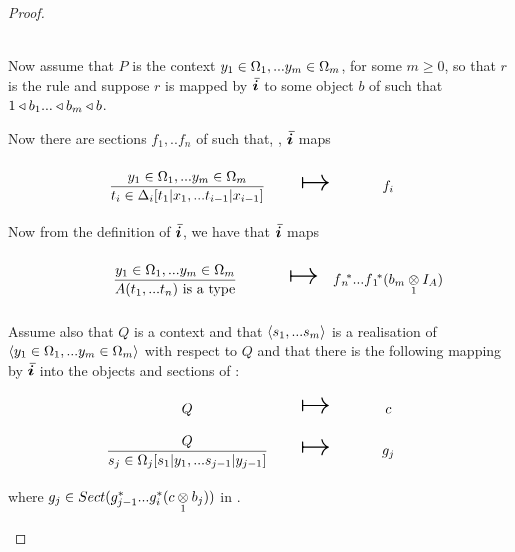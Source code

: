 \begin{proof}
\begin{newtt}
                                                               \\

\newcommand{\clausethreelhs}{(\gmvectorstar (\crossx{c}{f_n}{1}))^* ... (\gmvectorstar (\crossx{c}{f_1}{1})) ^* (\crossx{b_m}{I_A}{1})}
\newcommand{\clausethreerhs}{\gmvectorstar (  \crossx{c}{(\fnvectorstar(\crossx{b_m}{I_A}{1}))}{1} )}
\newcommand{\tirule}{\gatdisplayrule{\yOmega{m}}{\ofT{t_i}{\Delta_i[t_1 | x_1,...t_{i-1}|x_{i-1}]}}}
Now assume that $P$ is the context $\yOmega{m}$, for some $m \geq 0$, so that $r$ is the rule 
and suppose $r$  is mapped by $\Ibar$ to some object $b$ of \catcw such that $1 \base b_1 ... \base b_m \base b$. 

Now there are sections  $f_1,..f_n$  of \catcw such that, \foreachi, $\Ibar$ maps
\begin{equation}
\label{timapping}
\begin{array}{c c c}
\forceSOURCEwidth & & \forceTARGETwidth \\ [-0.1cm]
\tirule    & \Imapsto & f_i \\ [0.4cm]
\end{array}
\end{equation} 
Now from the definition of $\Ibar$, we have that $\Ibar$ maps
\begin{equation*}
\begin{array}{c c c}
\forceSOURCEwidth & & \forceTARGETwidth \\ [-0.1cm]
\gatdisplayrule{\yOmega{m}}{\isT{A(\tn)}}   & \Imapsto & \fnvectorstar(\crossx{b_m}{I_A}{1})\\ [0.4cm]
\end{array}
\end{equation*} 

Assume also  that $Q$ is a context and that $\tuple{\sm}$ is a realisation of $\tuple{\yOmega{m}}$ with respect to $Q$
and that there is the following mapping by $\Ibar$ into the objects and sections of \catc:
\begin{equation}
\label{sjmapping}
\begin{array}{c c c}
\forceSOURCEwidth & & \forceTARGETwidth \\ [-0.1cm]
Q          & \Imapsto & c   \\ [0.4cm]
\IsOmega{j}    & \Imapsto & g_j \\ [0.4cm]
\end{array}
\end{equation}
where $g_j \in Sect(g_{j-1}^*...g_i^*(\crossx{c}{b_j}{1}))$ in \catc.


\end{newtt}
\end{proof}

